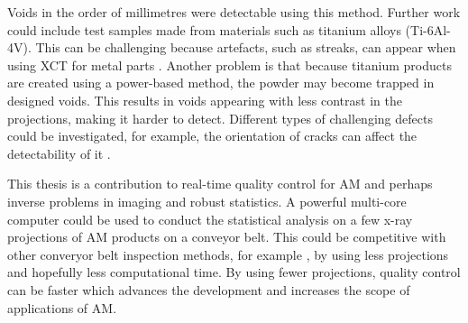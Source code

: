 \documentclass[12pt, a4paper, twoside]{memoir}
\begin{document}
Voids in the order of millimetres were detectable using this method. Further work could include test samples made from materials such as titanium alloys (Ti-6Al-4V). This can be challenging because artefacts, such as streaks, can appear when using XCT for metal parts \citep{deman1998metal, nawaz2014metal}. Another problem is that because titanium products are created using a power-based method, the powder may become trapped \citep{brierley2018optimized} in designed voids. This results in voids appearing with less contrast in the projections, making it harder to detect. Different types of challenging defects could be investigated, for example, the orientation of cracks can affect the detectability of it \citep{wooldridge1997demonstrating}.

This thesis is a contribution to real-time quality control for AM and perhaps inverse problems in imaging \citep{bertero1998introduction} and robust statistics. A powerful multi-core computer could be used to conduct the statistical analysis on a few x-ray projections of AM products on a conveyor belt. This could be competitive with other converyor belt inspection methods, for example \cite{warnett2016towards}, by using less projections and hopefully less computational time. By using fewer projections, quality control can be faster which advances the development and increases the scope of applications of AM.




\begin{appendices}

\end{appendices}
\end{document}
